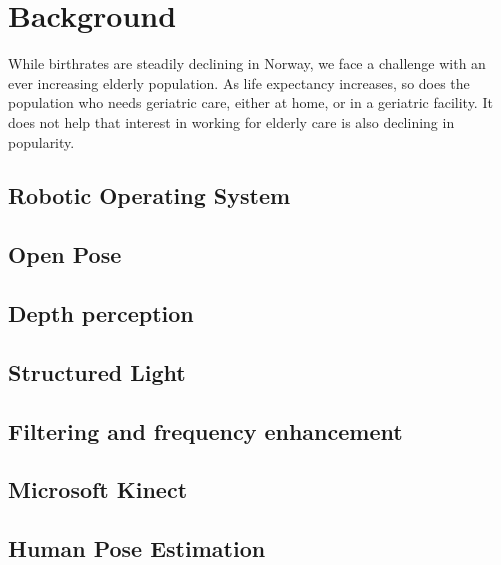 \chapter{Background}

While birthrates are steadily declining in Norway, we face a challenge with an ever increasing elderly population. As life expectancy increases, so does the population who needs geriatric care, either at home, or in a geriatric facility. It does not help that interest in working for elderly care is also declining in popularity.





\section{Robotic Operating System}

\section{Open Pose}

\section{Depth perception}

\section{Structured Light}

\section{Filtering and frequency enhancement}

\section{Microsoft Kinect}

\section{Human Pose Estimation}
